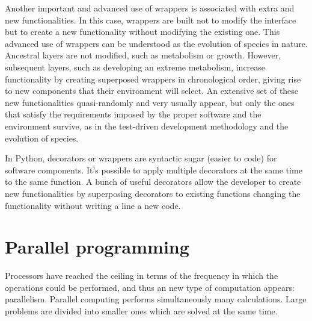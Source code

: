 
Another important and advanced use of wrappers is associated with extra and new functionalities. 
In this case, wrappers are built not to 
modify the interface  but to create a new functionality without modifying the existing one. This advanced 
use of wrappers can be understood as the evolution of species in nature. 
Ancestral layers are not modified, such as metabolism or growth. However, subsequent layers, 
such as developing an extreme metabolism,  increase functionality by creating superposed 
wrappers in chronological order, giving rise to new components that their 
environment will select. 
An extensive set of these new functionalities quasi-randomly and very usually appear, 
but only the ones that satisfy 
the requirements imposed by the proper software and the environment survive, 
as in the test-driven development methodology and the evolution of 
species.





In Python, decorators or wrappers are syntactic sugar (easier to code) for software components. 
It's possible to apply multiple decorators at the same time to the same function. 
A bunch of useful decorators allow the developer to create new functionalities by superposing 
decorators to existing functions changing the functionality 
without writing a line a new code. 






\newpage 
\section{Parallel programming} 
Processors have reached the ceiling in terms of the frequency in which the operations 
could be performed, and thus an new type of computation appears: parallelism.  
Parallel computing performs simultaneously many calculations. 
Large problems are divided into smaller ones which are solved at the same time.

